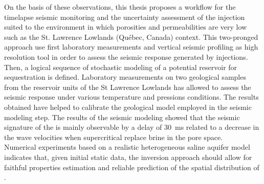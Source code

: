 On the basis of these observations, this thesis proposes a workflow for the
timelapse seismic monitoring and the uncertainty assessment of the
 injection suited to the environment in which porosities and
permeabilities are very low such as the St. Lawrence Lowlands (Québec, Canada) context.
This two-pronged approach use first laboratory measurements and vertical
seismic profiling as high resolution tool in order to assess the seismic
response generated by  injections. Then, a logical sequence of
stochastic modeling of a potential reservoir for  sequestration is
defined.
Laboratory measurements on two geological samples from the reservoir units
of the St Lawrence Lowlands has allowed to assess the seismic
response under various temperature and pressions conditions. The results
obtained have helped to calibrate the geological model employed in the seismic
modeling step. The results of the seismic modeling showed that the seismic
signature of the  is mainly observable by a delay of
\SI{30}{\milli\second} related to a decrease in the wave velocities when
supercritical  replace brine in the pore space.\\
Numerical experiments based on a realistic heterogeneous saline aquifer model
indicates that, given initial static data, the inversion approach should allow
for faithful properties estimation and reliable prediction of the spatial
distribution of .
